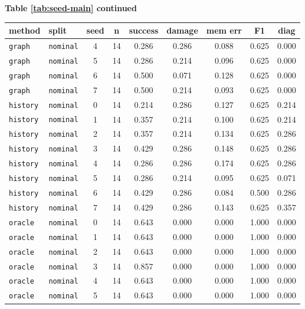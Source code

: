 \documentclass{article}
\begin{document}
\begin{center}
\textbf{Table \ref{tab:seed-main} continued}\\[0.4ex]
\begin{tabular}{llccccccc}
\toprule
method & split & seed & n & success & damage & mem err & F1 & diag \\
\midrule
\texttt{graph} & \texttt{nominal} & 4 & 14 & 0.286 & 0.286 & 0.088 & 0.625 & 0.000 \\
\texttt{graph} & \texttt{nominal} & 5 & 14 & 0.286 & 0.214 & 0.096 & 0.625 & 0.000 \\
\texttt{graph} & \texttt{nominal} & 6 & 14 & 0.500 & 0.071 & 0.128 & 0.625 & 0.000 \\
\texttt{graph} & \texttt{nominal} & 7 & 14 & 0.500 & 0.214 & 0.093 & 0.625 & 0.000 \\
\texttt{history} & \texttt{nominal} & 0 & 14 & 0.214 & 0.286 & 0.127 & 0.625 & 0.214 \\
\texttt{history} & \texttt{nominal} & 1 & 14 & 0.357 & 0.214 & 0.100 & 0.625 & 0.214 \\
\texttt{history} & \texttt{nominal} & 2 & 14 & 0.357 & 0.214 & 0.134 & 0.625 & 0.286 \\
\texttt{history} & \texttt{nominal} & 3 & 14 & 0.429 & 0.286 & 0.148 & 0.625 & 0.286 \\
\texttt{history} & \texttt{nominal} & 4 & 14 & 0.286 & 0.286 & 0.174 & 0.625 & 0.286 \\
\texttt{history} & \texttt{nominal} & 5 & 14 & 0.286 & 0.214 & 0.095 & 0.625 & 0.071 \\
\texttt{history} & \texttt{nominal} & 6 & 14 & 0.429 & 0.286 & 0.084 & 0.500 & 0.286 \\
\texttt{history} & \texttt{nominal} & 7 & 14 & 0.429 & 0.286 & 0.143 & 0.625 & 0.357 \\
\texttt{oracle} & \texttt{nominal} & 0 & 14 & 0.643 & 0.000 & 0.000 & 1.000 & 0.000 \\
\texttt{oracle} & \texttt{nominal} & 1 & 14 & 0.643 & 0.000 & 0.000 & 1.000 & 0.000 \\
\texttt{oracle} & \texttt{nominal} & 2 & 14 & 0.643 & 0.000 & 0.000 & 1.000 & 0.000 \\
\texttt{oracle} & \texttt{nominal} & 3 & 14 & 0.857 & 0.000 & 0.000 & 1.000 & 0.000 \\
\texttt{oracle} & \texttt{nominal} & 4 & 14 & 0.643 & 0.000 & 0.000 & 1.000 & 0.000 \\
\texttt{oracle} & \texttt{nominal} & 5 & 14 & 0.643 & 0.000 & 0.000 & 1.000 & 0.000 \\

\end{tabular}
\end{center}
\end{document}
